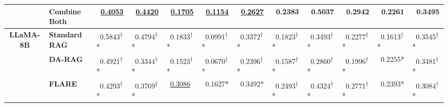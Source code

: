 \documentclass[sigconf,natbib=true,anonymous=false]{acmart}
\begin{document}
\begin{table}[t]
\begin{tabular}{|cl|c|c|c|c|c|c|c|c|c|c|}
& \textbf{Combine Both}
& \multicolumn{1}{l|}{~\underline{0.4053}}& \multicolumn{1}{l|}{~\underline{0.4420}}& \multicolumn{1}{l|}{~\underline{0.1705}}& \multicolumn{1}{l|}{~\underline{0.1154}}& \multicolumn{1}{l|}{~\underline{0.2627}}& \multicolumn{1}{l|}{~\textbf{0.2383}}& \multicolumn{1}{l|}{~\textbf{0.5037}}& \multicolumn{1}{l|}{~\textbf{0.2942}}& \multicolumn{1}{l|}{~\textbf{0.2261}}& \multicolumn{1}{l|}{~\textbf{0.3495}}\\


\toprule

\multirow{6}{*}{\textbf{LLaMA-8B}}


& \textbf{Standard RAG}
& \multicolumn{1}{l|}{~0.5843\textsuperscript{\tiny $\dagger$}*}& \multicolumn{1}{l|}{~0.4794\textsuperscript{\tiny $\dagger$}*}& \multicolumn{1}{l|}{~0.1833\textsuperscript{\tiny $\dagger$}*}& \multicolumn{1}{l|}{~0.0991\textsuperscript{\tiny $\dagger$}*}& \multicolumn{1}{l|}{~0.3372\textsuperscript{\tiny $\dagger$}*}& \multicolumn{1}{l|}{~0.1823\textsuperscript{\tiny $\dagger$}*}& \multicolumn{1}{l|}{~0.3493\textsuperscript{\tiny $\dagger$}*}& \multicolumn{1}{l|}{~0.2277\textsuperscript{\tiny $\dagger$}*}& \multicolumn{1}{l|}{~0.1613\textsuperscript{\tiny $\dagger$}*}& \multicolumn{1}{l|}{~0.3545\textsuperscript{\tiny $\dagger$}*}\\

& \textbf{DA-RAG} 
& \multicolumn{1}{l|}{~0.4921\textsuperscript{\tiny $\dagger$}*}& \multicolumn{1}{l|}{~0.3344\textsuperscript{\tiny $\dagger$}*}& \multicolumn{1}{l|}{~0.1523\textsuperscript{\tiny $\dagger$}*}& \multicolumn{1}{l|}{~0.0670\textsuperscript{\tiny $\dagger$}*}& \multicolumn{1}{l|}{~0.2396\textsuperscript{\tiny $\dagger$}*}& \multicolumn{1}{l|}{~0.1587\textsuperscript{\tiny $\dagger$}*}& \multicolumn{1}{l|}{~0.2860\textsuperscript{\tiny $\dagger$}*}& \multicolumn{1}{l|}{~0.1996\textsuperscript{\tiny $\dagger$}*}& \multicolumn{1}{l|}{~0.2255*}& \multicolumn{1}{l|}{~0.3481\textsuperscript{\tiny $\dagger$}*}\\


& \textbf{FLARE} 
& \multicolumn{1}{l|}{~0.4293\textsuperscript{\tiny $\dagger$}*}& \multicolumn{1}{l|}{~0.3769\textsuperscript{\tiny $\dagger$}*}& \multicolumn{1}{l|}{~\underline{0.3086}}& \multicolumn{1}{l|}{~0.1627*}& \multicolumn{1}{l|}{~0.3492*}& \multicolumn{1}{l|}{~0.2493\textsuperscript{\tiny $\dagger$}*}& \multicolumn{1}{l|}{~0.4324\textsuperscript{\tiny $\dagger$}*}& \multicolumn{1}{l|}{~0.2771\textsuperscript{\tiny $\dagger$}*}& \multicolumn{1}{l|}{~0.2393*}& \multicolumn{1}{l|}{~0.3084\textsuperscript{\tiny $\dagger$}*}\\



\end{tabular}
\end{table}
\end{document}
